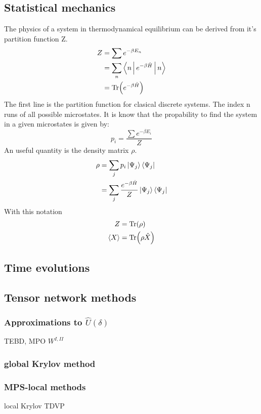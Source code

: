 
\subsection{Statistical mechanics}

The physics of a system in thermodynamical equilibrium can be derived from it's partition function Z.
\begin{equation}
    \begin{split}
        Z &= \sum e^{ - \beta E_n} \\
        &= \sum_n \Braket{n | e^{ - \beta \hat{H} }  | n} \\
        &= \Tr( e^{ - \beta \hat{H} } )
    \end{split}
\end{equation}
The first line is the partition function for clasical discrete systems. The index n runs of all possible microstates. It is know that the propability to find the system in a given microstates is given by:
\begin{equation}
    p_i = \frac{\sum e^{ - \beta E_i}}{Z}
\end{equation}
An useful quantity is the density matrix $\rho$.
\begin{equation}
    \begin{split}
        \rho &= \sum_j p_i  \Ket{ \Psi_j} \Bra{\Psi_j}   \\
        &= \sum_j \frac{ e^{ - \beta \hat{H} } }{Z}  \Ket{ \Psi_j} \Bra{\Psi_j}
    \end{split}
\end{equation}
With this notation
\begin{equation}
    \begin{split}
        Z &= \Tr( \rho) \\
        \Braket{X} &= \Tr(\rho \hat{X})
    \end{split}
\end{equation}

\subsection{Time evolutions}

\subsection{Tensor network methods}


\subsubsection{Approximations to  \texorpdfstring{$ \hat{U}(\delta)$}{U}   }

TEBD, MPO $W^{I,II}$

\subsubsection{global Krylov method }

\subsubsection{MPS-local methods }
local Krylov
TDVP